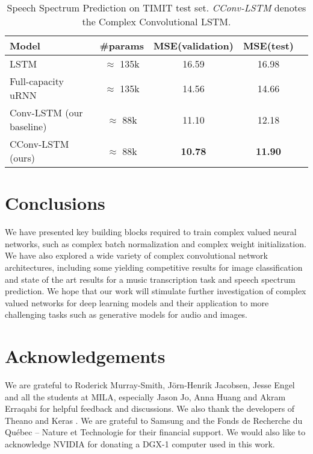 \documentclass{article}
\begin{document}
\begin{table}[t]
\vskip 0.15in
\begin{center}
\caption{Speech Spectrum Prediction on TIMIT test set. \emph{CConv-LSTM} denotes the Complex Convolutional LSTM.}
\label{tab:TIMIT}
\begin{small}
\begin{sc}
\begin{tabular}{lcccc}
\toprule
Model & \#params & MSE(validation) & MSE(test) \\
\midrule
LSTM \cite{wisdom2016full}&  $\approx$ 135k&  16.59& 16.98 \\
Full-capacity uRNN \cite{wisdom2016full} &  $\approx$ 135k&  14.56&  14.66\\
Conv-LSTM (our baseline)&  $\approx$ 88k&  11.10& 12.18\\
CConv-LSTM (ours) & $\approx$ 88k& \textbf{10.78} & \textbf{11.90}\\
\bottomrule
\end{tabular}
\end{sc}
\end{small}
\end{center}	
\vskip -0.1in
\end{table}

\section{Conclusions}
\label{conclusion}
We have presented key building blocks required to train complex valued neural networks, such as complex batch normalization and complex weight initialization. We have also explored a wide variety of complex convolutional network architectures, including some yielding competitive results for image classification and state of the art results for a music transcription task and speech spectrum prediction. We hope that our work will stimulate further investigation of complex valued networks for deep learning models and their application to more challenging tasks such as generative models for audio and images. 

\section*{Acknowledgements}
We are grateful to Roderick Murray-Smith, Jörn-Henrik Jacobsen, Jesse Engel and all the students at MILA, especially Jason Jo, Anna Huang and Akram Erraqabi for helpful feedback and discussions. We also thank the developers of Theano \citep{2016arXiv160502688short} and Keras \citep{chollet2015keras}. We are grateful to Samsung and the Fonds de Recherche du Québec -- Nature et Technologie for their financial support. We would also like to acknowledge NVIDIA for donating a DGX-1 computer used in this work.
\end{document}
